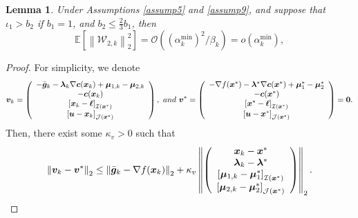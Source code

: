 \documentclass[aos]{imsart}
\numberwithin{equation}{section}
\theoremstyle{plain}
\newtheorem{lemma}{Lemma}
\begin{document}
\begin{appendix}
\begin{lemma}
Under Assumptions \ref{assump5} and  \ref{assump9}, and suppose that $\iota_1>b_2$ if $b_1=1$, and $b_2 \leq \frac{2}{3}b_1$, then
    \begin{equation*}
        \mathbb{E} \left[ \left\|\mathcal{W}_{2,k} \right\|_2^2 \right] = \mathcal{O} \left( (\alpha^{\min}_k)^2 / \beta_k \right) = o\left( \alpha^{\min}_k \right),
    \end{equation*}
\end{lemma}


\begin{proof}
    For simplicity, we denote
    \begin{equation*}
        \bm{v}_k = \left( \begin{array}{c}
        - \Bar{\bm{g}}_k - \bm{\lambda}_{k} \nabla \bm{c}(\bm{x}_k)  + \bm{\mu}_{1,k} - \bm{\mu}_{2,k}\\
        -\bm{c}(\bm{x}_k)\\
        \left[\bm{x}_k - \bm{\ell}\right]_{\mathcal{I}(\bm{x}^{*})}\\
        \left[\bm{u} - \bm{x}_{k}\right]_{\mathcal{J}(\bm{x}^{*})}
       \end{array} \right),~and~ \bm{v}^{*} = \left( \begin{array}{c}
        - \nabla f(\bm{x}^{*}) - \bm{\lambda}^{*} \nabla \bm{c}(\bm{x}^{*})  + \bm{\mu}_{1}^{*} - \bm{\mu}_{2}^{*}\\
        -\bm{c}(\bm{x}^{*})\\
        \left[\bm{x}^{*} - \bm{\ell}\right]_{\mathcal{I}(\bm{x}^{*})}\\
        \left[\bm{u} - \bm{x}^{*}\right]_{\mathcal{J}(\bm{x}^{*})}
       \end{array} \right) = \bm{0}.
    \end{equation*}
    Then, there exist some $\kappa_{v} > 0$ such that
    \begin{equation*}
        \left\| \bm{v}_{k} - \bm{v}^{*} \right\|_2 \leq \left\| \Bar{\bm{g}}_k - \nabla f(\bm{x}_{k}) \right\|_2 + \kappa_{v} \left\|  \left( \begin{array}{c}
    \bm{x}_{k} - \bm{x}^{*}  \\
    \bm{\lambda}_{k} - \bm{\lambda}^{*} \\
    \left[ \bm{\mu}_{1,k} - \bm{\mu}_{1}^{*}\right]_{\mathcal{I}(\bm{x}^{*})} \\
    \left[ \bm{\mu}_{2,k} - \bm{\mu}_{2}^{*} \right]_{\mathcal{J}(\bm{x}^{*})} 
    \end{array} \right)  \right\|_2.

\end{equation*}
\end{proof}
\end{appendix}
\end{document}
